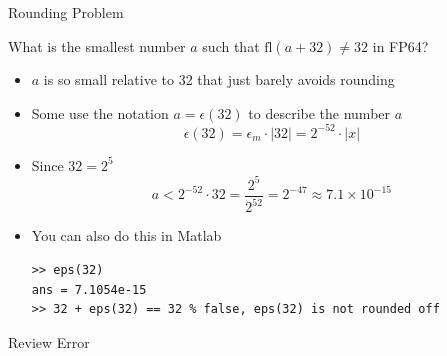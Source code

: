 \documentclass[10pt]{beamer}
\begin{document}
\begin{frame}[fragile]{Rounding Problem}

\begin{example}
    What is the smallest number $a$ such that $\mathrm{fl}(a+32) \ne 32$ in FP64?
\end{example}

\begin{itemize}

  \item $a$ is so small relative to 32 that just barely avoids rounding
  \item Some use the notation $a = \epsilon(32)$ to describe the number $a$
    $$
    \epsilon(32)  = \epsilon_m \cdot |32| = 2^{-52} \cdot |x|
    $$
  \item Since $32 = 2^5$
    $$
    a < 2^{-52} \cdot 32 = \frac{2^5}{2^{52}} = 2^{-47} \approx 7.1\times10^{-15}
    $$

    \item You can also do this in Matlab 
\begin{lstlisting}
>> eps(32)
ans = 7.1054e-15
>> 32 + eps(32) == 32 % false, eps(32) is not rounded off
\end{lstlisting}
\end{itemize}

\end{frame}


\begin{frame}{Review Error}



\end{frame}
\end{document}
